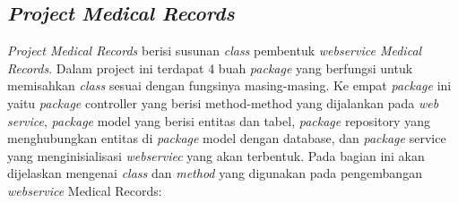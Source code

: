 \subsection{\textit{Project} \textit{Medical Records}}
\textit{Project Medical Records} berisi susunan \textit{class} pembentuk \textit{webservice Medical Records}. Dalam project ini terdapat 4 buah \textit{package} yang berfungsi untuk memisahkan \textit{class} sesuai dengan fungsinya masing-masing. Ke empat \textit{package} ini yaitu \textit{package} controller yang berisi method-method yang dijalankan pada \textit{web service}, \textit{package} model yang berisi entitas dan tabel, \textit{package} repository yang menghubungkan entitas di \textit{package} model dengan database, dan \textit{package} service yang menginisialisasi \textit{webserviec} yang akan terbentuk. Pada bagian ini akan dijelaskan mengenai \textit{class} dan \textit{method} yang digunakan pada pengembangan \textit{ webservice} Medical Records:
